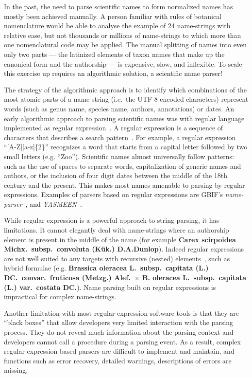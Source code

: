 \documentclass{bmcart}
\begin{document}
In the past, the need to parse scientific names to form normalized names has mostly been achieved manually. A person familiar with rules of botanical nomenclature would be able to analyse the example of 24 name-strings with relative ease, but not thousands or millions of name-strings to which more than one nomenclatural code may be applied. The manual splitting of names into even only two parts --- the latinized elements of taxon names that make up the canonical form and the authorship --- is expensive, slow, and inflexible. To scale this exercise up requires an algorithmic solution, a scientific name parser!

The strategy of the algorithmic approach is to identify which combinations of the most atomic parts of a name-string (i.e.\ the UTF-8 encoded characters) represent words (such as genus name, species name, authors, annotations) or dates. An early algorithmic approach to parsing scientific names was with regular language implemented as regular expression~\cite{Leary2007}. A regular expression is a sequence of characters that describes a search pattern~\cite{aho1992foundations}. For example, a regular expression ``[A-Z][a-z]\{2\}'' recognizes a word that starts from a capital letter followed by two small letters (e.g. ``Zoo''). Scientific names almost universally follow patterns: such as the use of spaces to separate words, capitalization of generic names and authors, or the inclusion of four digit dates between the middle of the 18th century and the present. This makes most names amenable to parsing by regular expressions.  Examples of parsers based on regular expressions are GBIF's \textit{name-parser}~\cite{gbifNameParser}, and \textit{YASMEEN}~\cite{VandenBerghe2015}.

While regular expression is a powerful approach to string parsing, it has limitations. It cannot elegantly deal with name-strings where an authorship element is present in the middle of the name (for example \textbf{Carex scirpoidea Michx.\ subsp.\ convoluta (Kük.) D.A.Dunlop}). Indeed regular expressions are not well suited to any targets with recursive (nested) elements~\cite{yu1997handbook}, such as hybrid formulae (e.g. \textbf{Brassica oleracea L.\ subsp.\ capitata (L.) DC.\ convar.\ fruticosa (Metzg.) Alef.\ $\times$ B.  oleracea L.\ subsp.\ capitata (L.) var.\ costata DC.}). Name parsing built on regular expressions is impractical for complex name-strings.

Another limitation with most regular expression software tools is that they are ``black boxes'' that allow developers very limited interaction with the parsing process. They do not reveal much information about the parsing context and developers cannot call a procedure during a parsing event. As a result, complex regular expression-based parsers are difficult to implement and maintain, and functions such as error recovery, detailed warnings, descriptions of errors are missing.
\end{document}
